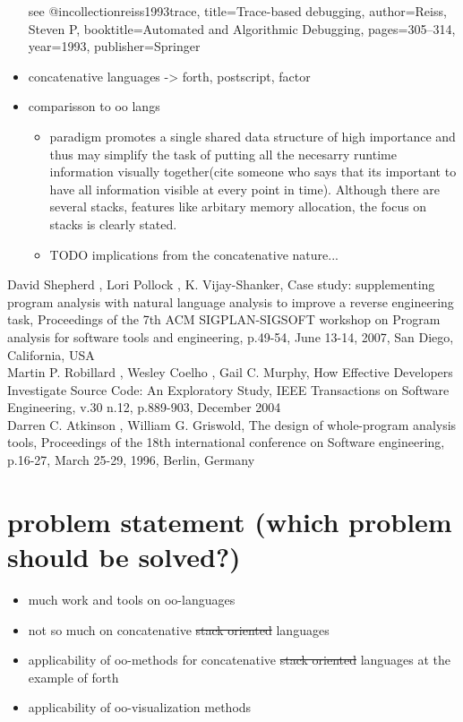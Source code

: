\begin{itemize}
 see @incollection{reiss1993trace,
  title={Trace-based debugging},
  author={Reiss, Steven P},
  booktitle={Automated and Algorithmic Debugging},
  pages={305--314},
  year={1993},
  publisher={Springer}
}
\item concatenative languages -> forth, postscript, factor
\item comparisson to oo langs
	\begin{itemize}
	\item paradigm promotes a single shared data structure of high importance and thus may simplify the task of putting all the necesarry runtime information visually together(cite someone who says that its important to have all information visible at every point in time). Although there are several stacks, features like arbitary memory allocation, the focus on stacks is clearly stated.
	\end{itemize}
	\begin{itemize}
	\item TODO implications from the concatenative nature...
	\end{itemize}
\end{itemize}

David Shepherd , Lori Pollock , K. Vijay-Shanker, Case study: supplementing program analysis with natural language analysis to improve a reverse engineering task, Proceedings of the 7th ACM SIGPLAN-SIGSOFT workshop on Program analysis for software tools and engineering, p.49-54, June 13-14, 2007, San Diego, California, USA \\

Martin P. Robillard , Wesley Coelho , Gail C. Murphy, How Effective Developers Investigate Source Code: An Exploratory Study, IEEE Transactions on Software Engineering, v.30 n.12, p.889-903, December 2004\\

Darren C. Atkinson , William G. Griswold, The design of whole-program analysis tools, Proceedings of the 18th international conference on Software engineering, p.16-27, March 25-29, 1996, Berlin, Germany\\

\section{problem statement (which problem should be solved?)}

\begin{itemize}
\item much work and tools on oo-languages
\item not so much on concatenative \sout{stack oriented} languages
\item applicability of oo-methods for concatenative \sout{stack oriented} languages at the example of forth
\item applicability of oo-visualization methods
\end{itemize}


